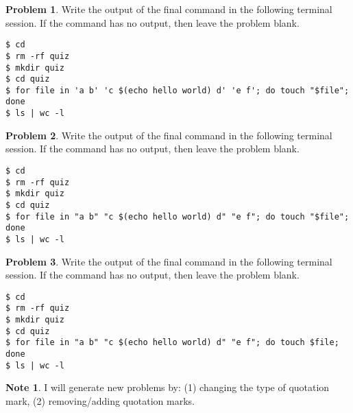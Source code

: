 \documentclass[10pt]{article}
\theoremstyle{definition}
\newtheorem{problem}{Problem}
\newtheorem{note}{Note}
\begin{document}
\begin{problem}
    Write the output of the final command in the following terminal session.
    If the command has no output, then leave the problem blank.
\end{problem}
\begin{lstlisting}
$ cd
$ rm -rf quiz
$ mkdir quiz
$ cd quiz
$ for file in 'a b' 'c $(echo hello world) d' 'e f'; do touch "$file"; done
$ ls | wc -l
\end{lstlisting}
\vspace{0.4in}

\newpage
\begin{problem}
    Write the output of the final command in the following terminal session.
    If the command has no output, then leave the problem blank.
\end{problem}
\begin{lstlisting}
$ cd
$ rm -rf quiz
$ mkdir quiz
$ cd quiz
$ for file in "a b" "c $(echo hello world) d" "e f"; do touch "$file"; done
$ ls | wc -l
\end{lstlisting}
\vspace{0.4in}

\begin{problem}
    Write the output of the final command in the following terminal session.
    If the command has no output, then leave the problem blank.
\end{problem}
\begin{lstlisting}
$ cd
$ rm -rf quiz
$ mkdir quiz
$ cd quiz
$ for file in "a b" "c $(echo hello world) d" "e f"; do touch $file; done
$ ls | wc -l
\end{lstlisting}
\vspace{0.4in}

\begin{note}
    I will generate new problems by:
    (1) changing the type of quotation mark,
    (2) removing/adding quotation marks.
\end{note}
\end{document}
